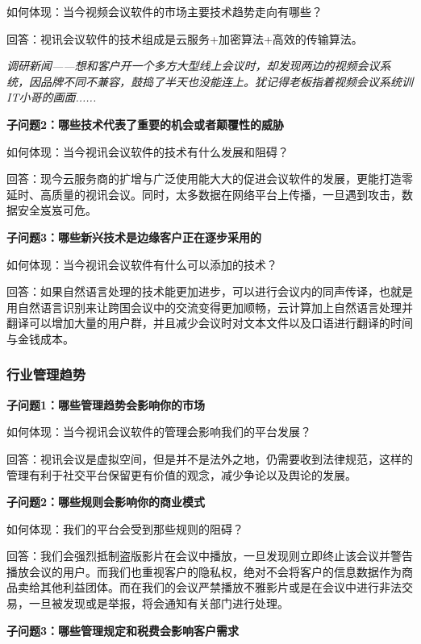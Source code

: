 \documentclass[a4paper,12pt]{article}
\begin{document}
    如何体现：当今视频会议软件的市场主要技术趋势⾛向有哪些？

    回答：视讯会议软件的技术组成是云服务+加密算法+⾼效的传输算法。

    \textit{调研新闻——想和客户开⼀个多⽅⼤型线上会议时，却发现两边的视频会议系统，因品牌不同不兼容，⿎捣了半天也没能连上。犹记得⽼板指着视频会议系统训IT⼩哥的画⾯......}

    \textit{}

    \textbf{子问题2：哪些技术代表了重要的机会或者颠覆性的威胁}

    如何体现：当今视讯会议软件的技术有什么发展和阻碍？

    回答：现今云服务商的扩增与⼴泛使⽤能⼤⼤的促进会议软件的发展，更能打造零延时、⾼质量的视讯会议。同时，太多数据在⽹络平台上传播，⼀旦遇到攻击，数据安全岌岌可危。

    \textbf{子问题3：哪些新兴技术是边缘客户正在逐步采用的}

    如何体现：当今视讯会议软件有什么可以添加的技术？

    回答：如果⾃然语⾔处理的技术能更加进步，可以进⾏会议内的同声传译，也就是⽤⾃然语⾔识别来让跨国会议中的交流变得更加顺畅，云计算加上⾃然语⾔处理并翻译可以增加⼤量的⽤户群，并且减少会议时对⽂本⽂件以及⼝语进⾏翻译的时间与⾦钱成本。

    \subsubsection{行业管理趋势}
    \textbf{子问题1：哪些管理趋势会影响你的市场}

    如何体现：当今视讯会议软件的管理会影响我们的平台发展？

    回答：视讯会议是虚拟空间，但是并不是法外之地，仍需要收到法律规范，这样的管理有利于社交平台保留更有价值的观念，减少争论以及舆论的发展。
    
    \textbf{子问题2：哪些规则会影响你的商业模式}

    如何体现：我们的平台会受到那些规则的阻碍？

    回答：我们会强烈抵制盗版影⽚在会议中播放，⼀旦发现则⽴即终⽌该会议并警告播放会议的⽤户。⽽我们也重视客户的隐私权，绝对不会将客户的信息数据作为商品卖给其他利益团体。⽽在我们的会议严禁播放不雅影⽚或是在会议中进⾏⾮法交易，⼀旦被发现或是举报，将会通知有关部门进⾏处理。

    \textit{}

    \textbf{子问题3：哪些管理规定和税费会影响客户需求}
\end{document}
